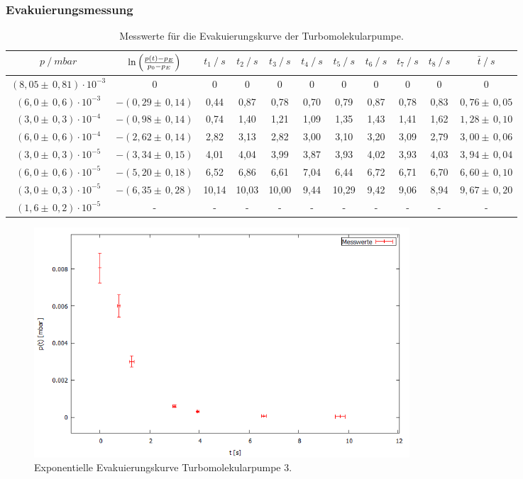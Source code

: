 \subsubsection{Evakuierungsmessung}
\begin{table}[H]
\tiny
\centering
\label{tab:EvakuierungskurveTurbo}
\begin{tabular}{c|c|c|c|c|c|c|c|c|c|c}
{$p \:/\: \si{mbar}$} & {$\ln{\Bigl( \frac{p(t)-p_E}{p_0-p_E}\Bigr)}$} & {$t_1 \:/\: \si{s} $} & {$t_2 \:/\: \si{s}$} & {$t_3 \:/\: \si{s}$} & {$t_4 \:/\: \si{s}$} & {$t_5 \:/\: \si{s}$} & {$t_6 \:/\: \si{s}$}& {$t_7 \:/\: \si{s}$} & {$t_8 \:/\: \si{s}$} & {$\bar{t} \:/\: \si{s}$}\\
\midrule
$(8,05 \pm \, 0,81)\cdot 10^{-3}$ & 0 & 0 &  0 & 0 & 0 & 0 & 0 & 0 & 0 & 0\\
$(6,0 \pm \, 0,6)\cdot 10^{-3}$ & $-(0,29 \pm \, 0,14)$ & 0,44 & 0,87 & 0,78 & 0,70 & 0,79 & 0,87 & 0,78 & 0,83 & $0,76 \pm \, 0,05$\\
$(3,0 \pm \, 0,3)\cdot 10^{-4}$ & $-(0,98 \pm \, 0,14)$ & 0,74 & 1,40 & 1,21 & 1,09 & 1,35 & 1,43 & 1,41 & 1,62 & $1,28 \pm \, 0,10$\\
$(6,0 \pm \, 0,6)\cdot 10^{-4}$ & $-(2,62 \pm \, 0,14)$ & 2,82 & 3,13 & 2,82 & 3,00 & 3,10 & 3,20 & 3,09 & 2,79 & $3,00 \pm \, 0,06$\\
$(3,0 \pm \, 0,3)\cdot 10^{-5}$ & $-(3,34 \pm \, 0,15)$ & 4,01 & 4,04 & 3,99 & 3,87 & 3,93 & 4,02 & 3,93 & 4,03 & $3,94 \pm \, 0,04$\\
$(6,0 \pm \, 0,6)\cdot 10^{-5}$ & $-(5,20 \pm \, 0,18)$ & 6,52 & 6,86 & 6,61 & 7,04 & 6,44 & 6,72 & 6,71 & 6,70 & $6,60 \pm \, 0,10$\\
$(3,0 \pm \, 0,3)\cdot 10^{-5}$ & $-(6,35 \pm \, 0,28)$ & 10,14 & 10,03 & 10,00 & 9,44 & 10,29 & 9,42 & 9,06 & 8,94 & $9,67 \pm \, 0,20$\\
$(1,6 \pm \, 0,2)\cdot 10^{-5}$ & - & - &  -& -& -& -& -& -& -& - \\
\end{tabular}
\caption{Messwerte für die Evakuierungskurve der Turbomolekularpumpe.}
\end{table}

\begin{figure}[H]
  \centering
  \includegraphics[width=14cm]{bilder/the final final plot.png}
  \caption{Exponentielle Evakuierungskurve Turbomolekularpumpe 3.}
  \label{turboexponential}
\end{figure}

